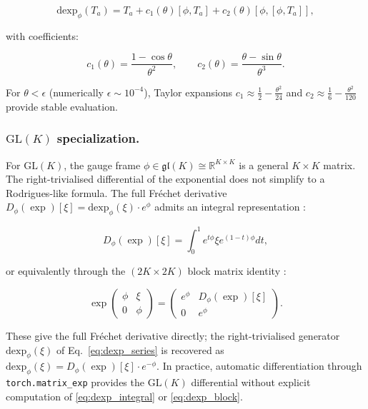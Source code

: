 \documentclass[twoside,11pt]{article}
\begin{document}
\begin{equation}
\mathrm{dexp}_\phi(T_a) = T_a + c_1(\theta)[\phi, T_a] + c_2(\theta)[\phi, [\phi, T_a]],
\label{eq:dexp_so3}
\end{equation}

with coefficients:

\begin{equation}
c_1(\theta) = \frac{1 - \cos\theta}{\theta^2}, \qquad c_2(\theta) = \frac{\theta - \sin\theta}{\theta^3}.
\end{equation}

For $\theta < \epsilon$ (numerically $\epsilon \sim 10^{-4}$), Taylor expansions $c_1 \approx \frac{1}{2} - \frac{\theta^2}{24}$ and $c_2 \approx \frac{1}{6} - \frac{\theta^2}{120}$ provide stable evaluation.

\subsubsection{$\mathrm{GL}(K)$ specialization.}

For $\mathrm{GL}(K)$, the gauge frame $\phi \in \mathfrak{gl}(K) \cong \mathbb{R}^{K \times K}$ is a general $K \times K$ matrix. The right-trivialised differential of the exponential does not simplify to a Rodrigues-like formula. The full Fr\'{e}chet derivative $D_\phi(\exp)[\xi] = \mathrm{dexp}_\phi(\xi) \cdot e^\phi$ admits an integral representation \citep[Eq.~10.15]{Higham2008}:

\begin{equation}
D_\phi(\exp)[\xi] = \int_0^1 e^{t\phi} \xi e^{(1-t)\phi} dt,
\label{eq:dexp_integral}
\end{equation}

or equivalently through the $(2K \times 2K)$ block matrix identity \citep[Algorithm~10.27]{Higham2008}:

\begin{equation}
\exp \begin{pmatrix} \phi & \xi \\ 0 & \phi \end{pmatrix}
= \begin{pmatrix} e^\phi & D_\phi(\exp)[\xi] \\ 0 & e^\phi \end{pmatrix}.
\label{eq:dexp_block}
\end{equation}

These give the full Fr\'{e}chet derivative directly; the right-trivialised generator $\mathrm{dexp}_\phi(\xi)$ of Eq.~\eqref{eq:dexp_series} is recovered as $\mathrm{dexp}_\phi(\xi) = D_\phi(\exp)[\xi] \cdot e^{-\phi}$. In practice, automatic differentiation through \texttt{torch.matrix\_exp} provides the $\mathrm{GL}(K)$ differential without explicit computation of \eqref{eq:dexp_integral} or \eqref{eq:dexp_block}.
\end{document}
